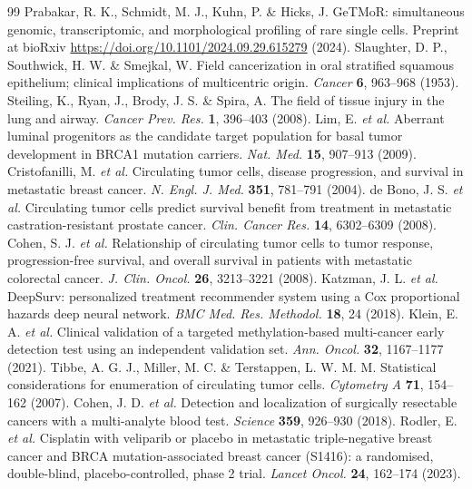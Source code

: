 \documentclass[11pt]{article}
\begin{document}
\begin{thebibliography}{99}
 Prabakar, R. K., Schmidt, M. J., Kuhn, P. \& Hicks, J. GeTMoR: simultaneous genomic, transcriptomic, and morphological profiling of rare single cells. Preprint at bioRxiv \url{https://doi.org/10.1101/2024.09.29.615279} (2024).
 Slaughter, D. P., Southwick, H. W. \& Smejkal, W. Field cancerization in oral stratified squamous epithelium; clinical implications of multicentric origin. \textit{Cancer} \textbf{6}, 963--968 (1953).
 Steiling, K., Ryan, J., Brody, J. S. \& Spira, A. The field of tissue injury in the lung and airway. \textit{Cancer Prev. Res.} \textbf{1}, 396--403 (2008).
 Lim, E. \textit{et al.} Aberrant luminal progenitors as the candidate target population for basal tumor development in BRCA1 mutation carriers. \textit{Nat. Med.} \textbf{15}, 907--913 (2009).
 Cristofanilli, M. \textit{et al.} Circulating tumor cells, disease progression, and survival in metastatic breast cancer. \textit{N. Engl. J. Med.} \textbf{351}, 781--791 (2004).
 de Bono, J. S. \textit{et al.} Circulating tumor cells predict survival benefit from treatment in metastatic castration-resistant prostate cancer. \textit{Clin. Cancer Res.} \textbf{14}, 6302--6309 (2008).
 Cohen, S. J. \textit{et al.} Relationship of circulating tumor cells to tumor response, progression-free survival, and overall survival in patients with metastatic colorectal cancer. \textit{J. Clin. Oncol.} \textbf{26}, 3213--3221 (2008).
 Katzman, J. L. \textit{et al.} DeepSurv: personalized treatment recommender system using a Cox proportional hazards deep neural network. \textit{BMC Med. Res. Methodol.} \textbf{18}, 24 (2018).
 Klein, E. A. \textit{et al.} Clinical validation of a targeted methylation-based multi-cancer early detection test using an independent validation set. \textit{Ann. Oncol.} \textbf{32}, 1167--1177 (2021).
 Tibbe, A. G. J., Miller, M. C. \& Terstappen, L. W. M. M. Statistical considerations for enumeration of circulating tumor cells. \textit{Cytometry A} \textbf{71}, 154--162 (2007).
 Cohen, J. D. \textit{et al.} Detection and localization of surgically resectable cancers with a multi-analyte blood test. \textit{Science} \textbf{359}, 926--930 (2018).
 Rodler, E. \textit{et al.} Cisplatin with veliparib or placebo in metastatic triple-negative breast cancer and BRCA mutation-associated breast cancer (S1416): a randomised, double-blind, placebo-controlled, phase 2 trial. \textit{Lancet Oncol.} \textbf{24}, 162--174 (2023).

\end{thebibliography}
\end{document}
